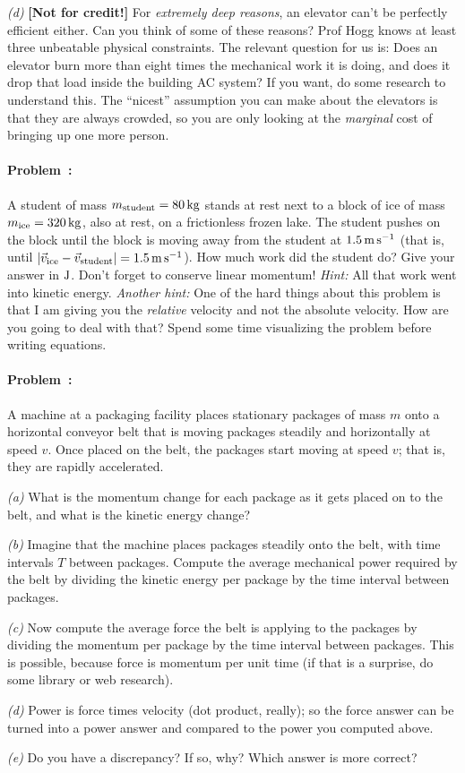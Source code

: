 \documentclass[12pt]{article}
\begin{document}
\textsl{(d)} \textbf{[Not for credit!]} For \emph{extremely deep reasons}, an
elevator can't be perfectly efficient either. Can you think of some of
these reasons? Prof Hogg knows at least three unbeatable physical
constraints. The relevant question for us is: Does an elevator burn
more than eight times the mechanical work it is doing, and does it
drop that load inside the building AC system? If you want, do some
research to understand this. The ``nicest'' assumption you can make
about the elevators is that they are always crowded, so you are only
looking at the \emph{marginal} cost of bringing up one more person.

\paragraph{Problem~\theproblem:}%
A student of mass $m_\mathrm{student}=80\,\mathrm{kg}$ stands at rest next to
a block of ice of mass $m_\mathrm{ice}=320\,\mathrm{kg}$, also at rest, on a
frictionless frozen lake.  The student pushes on the block until the
block is moving away from the student at $1.5\,\mathrm{m}\,\mathrm{s}^{-1}$ (that is, until
$\left|\vec{v}_\mathrm{ice}-\vec{v}_\mathrm{student}\right|=1.5\,\mathrm{m}\,\mathrm{s}^{-1}$).
How much work did the student do?  Give your answer in $\mathrm{J}$.  Don't
forget to conserve linear momentum!  \emph{Hint:} All that work went into
kinetic energy.  \emph{Another hint:} One of the hard things about
this problem is that I am giving you the \emph{relative} velocity and
not the absolute velocity.  How are you going to deal with that?
Spend some time visualizing the problem before writing equations.

\paragraph{Problem~\theproblem:}%
A machine at a packaging facility places stationary packages of mass
$m$ onto a horizontal conveyor belt that is moving packages steadily
and horizontally at speed $v$. Once placed on the belt, the packages
start moving at speed $v$; that is, they are rapidly accelerated.

\textsl{(a)} What is the momentum change for each package as it
gets placed on to the belt, and what is the kinetic energy change?

\textsl{(b)} Imagine that the machine places packages steadily onto
the belt, with time intervals $T$ between packages. Compute the
average mechanical power required by the belt by dividing the kinetic
energy per package by the time interval between packages.

\textsl{(c)} Now compute the average force the belt is applying to the
packages by dividing the momentum per package by the time interval
between packages. This is possible, because force is momentum per unit
time (if that is a surprise, do some library or web research).

\textsl{(d)} Power is force times velocity (dot product, really); so
the force answer can be turned into a power answer and compared to the
power you computed above.

\textsl{(e)} Do you have a discrepancy? If so, why? Which answer is
more correct?
\end{document}
